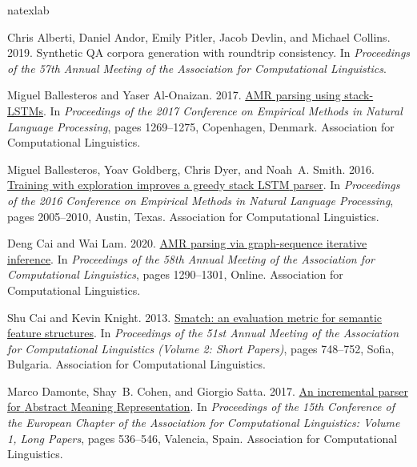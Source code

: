 \documentclass[11pt,a4paper]{article}
\begin{document}
\begin{thebibliography}{27}
\expandafter\ifx\csname natexlab\endcsname\relax\def\natexlab#1{#1}\fi

Chris Alberti, Daniel Andor, Emily Pitler, Jacob Devlin, and Michael Collins.
  2019.
\newblock Synthetic {QA} corpora generation with roundtrip consistency.
\newblock In \emph{Proceedings of the 57th Annual Meeting of the Association
  for Computational Linguistics}.

Miguel Ballesteros and Yaser Al-Onaizan. 2017.
\newblock \href {https://doi.org/10.18653/v1/D17-1130} {{AMR} parsing using
  stack-{LSTM}s}.
\newblock In \emph{Proceedings of the 2017 Conference on Empirical Methods in
  Natural Language Processing}, pages 1269--1275, Copenhagen, Denmark.
  Association for Computational Linguistics.

Miguel Ballesteros, Yoav Goldberg, Chris Dyer, and Noah~A. Smith. 2016.
\newblock \href {https://doi.org/10.18653/v1/D16-1211} {Training with
  exploration improves a greedy stack {LSTM} parser}.
\newblock In \emph{Proceedings of the 2016 Conference on Empirical Methods in
  Natural Language Processing}, pages 2005--2010, Austin, Texas. Association
  for Computational Linguistics.

Deng Cai and Wai Lam. 2020.
\newblock \href {https://doi.org/10.18653/v1/2020.acl-main.119} {{AMR} parsing
  via graph-sequence iterative inference}.
\newblock In \emph{Proceedings of the 58th Annual Meeting of the Association
  for Computational Linguistics}, pages 1290--1301, Online. Association for
  Computational Linguistics.

Shu Cai and Kevin Knight. 2013.
\newblock \href {https://www.aclweb.org/anthology/P13-2131} {{S}match: an
  evaluation metric for semantic feature structures}.
\newblock In \emph{Proceedings of the 51st Annual Meeting of the Association
  for Computational Linguistics (Volume 2: Short Papers)}, pages 748--752,
  Sofia, Bulgaria. Association for Computational Linguistics.

Marco Damonte, Shay~B. Cohen, and Giorgio Satta. 2017.
\newblock \href {https://www.aclweb.org/anthology/E17-1051} {An incremental
  parser for {A}bstract {M}eaning {R}epresentation}.
\newblock In \emph{Proceedings of the 15th Conference of the {E}uropean Chapter
  of the Association for Computational Linguistics: Volume 1, Long Papers},
  pages 536--546, Valencia, Spain. Association for Computational Linguistics.


\end{thebibliography}
\end{document}
